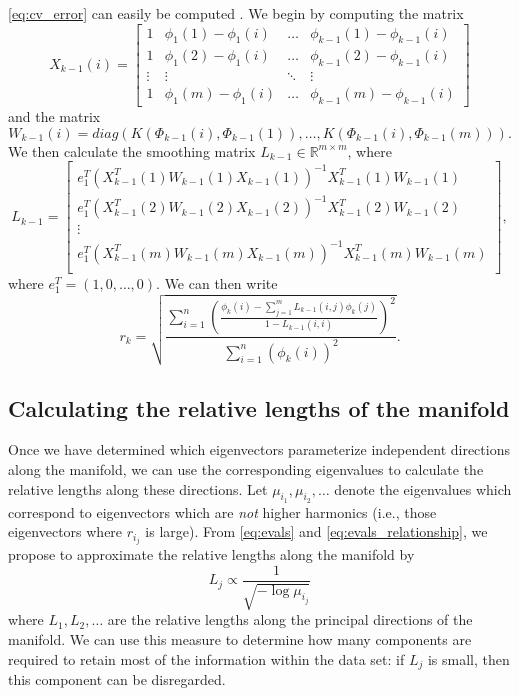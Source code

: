 \documentclass[preprint]{elsarticle}
\begin{document}
\eqref{eq:cv_error} can easily be computed \cite{wasserman2006all}.
%
We begin by computing the matrix
\begin{equation}
X_{k-1}(i) = \begin{bmatrix}
1 & \phi_1(1) - \phi_1(i) & \dots & \phi_{k-1}(1)- \phi_{k-1}(i) \\
1 & \phi_1(2) - \phi_1(i) & \dots & \phi_{k-1}(2)- \phi_{k-1}(i) \\
\vdots & \vdots & \ddots & \vdots \\
1 & \phi_1(m) - \phi_1(i) & \dots & \phi_{k-1}(m)- \phi_{k-1}(i) 
\end{bmatrix}
\end{equation}
%
and the matrix 
\begin{equation}
W_{k-1}(i) = diag \left( K(\Phi_{k-1}(i), \Phi_{k-1}(1)), \dots, K(\Phi_{k-1}(i), \Phi_{k-1}(m)) \right).
\end{equation}
%
We then calculate the smoothing matrix $L_{k-1} \in \mathbb{R}^{m \times m}$, where 
\begin{equation}
L_{k-1} =
\begin{bmatrix}
e_1^T \left( X_{k-1}^T(1) W_{k-1}(1) X_{k-1}(1) \right) ^{-1} X_{k-1}^T(1) W_{k-1}(1) \\
e_1^T \left( X_{k-1}^T(2) W_{k-1}(2) X_{k-1}(2) \right) ^{-1} X_{k-1}^T(2) W_{k-1}(2) \\
\vdots \\
e_1^T \left( X_{k-1}^T(m) W_{k-1}(m) X_{k-1}(m) \right) ^{-1} X_{k-1}^T(m) W_{k-1}(m) \\
\end{bmatrix},
\end{equation}
%
where $e_1^T = (1, 0, \dots, 0)$. 
%
We can then write
%
\begin{equation} 
r_{k} = \sqrt{ \frac{\sum_{i=1}^n \left( \frac{ \phi_{k} (i) - \sum_{j=1}^m L_{k-1}(i,j) \phi_{k}(j) }{1-L_{k-1}(i,i)} \right)^2} {\sum_{i=1}^n  \left( \phi_{k} (i) \right)^2 }} .
\end{equation}

\subsection{Calculating the relative lengths of the manifold} \label{sec:relative_lengths}

Once we have determined which eigenvectors parameterize independent directions along the manifold, we can use the corresponding eigenvalues to calculate the relative lengths along these directions. 
%
Let $\mu_{i_1}, \mu_{i_2}, \dots$ denote the eigenvalues which correspond to eigenvectors which are {\em not} higher harmonics (i.e., those eigenvectors where $r_{i_j}$ is large). 
%
From \eqref{eq:evals} and \eqref{eq:evals_relationship}, we propose to approximate the relative lengths along the manifold by
\begin{equation} \label{eq:est_lengths}
L_j \propto \frac{1}{\sqrt{-\log \mu_{i_j}}}
\end{equation}
where $L_1, L_2, \dots$ are the relative lengths along the principal directions of the manifold. 
%
We can use this measure to determine how many components are required to retain most of the information within the data set: if $L_j$ is small, then this component can be disregarded. 
\end{document}
